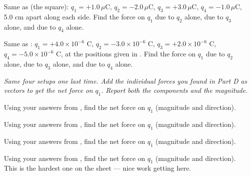 \documentclass[12pt]{article}
\begin{document}
\clearpage

\prob Same as  (the square): $q_1=+1.0\,\mu\text{C}$, $q_2=-2.0\,\mu\text{C}$, $q_3=+3.0\,\mu\text{C}$, $q_4=-1.0\,\mu\text{C}$, 5.0 cm apart along each side. Find the force on $q_1$ due to $q_2$ alone, due to $q_3$ alone, and due to $q_4$ alone.

\vspace{2cm}

\clearpage

\prob Same as : $q_1=+4.0\times10^{-6}$ C, $q_2=-3.0\times10^{-6}$ C, $q_3=+2.0\times10^{-6}$ C, $q_4=-5.0\times10^{-6}$ C, at the positions given in . Find the force on $q_1$ due to $q_2$ alone, due to $q_3$ alone, and due to $q_4$ alone.

\vspace{2cm}

\clearpage

\textit{Same four setups one last time. Add the individual forces you found in Part D as vectors to get the net force on $q_1$. Report both the components and the magnitude.}

\prob Using your answers from , find the net force on $q_1$ (magnitude and direction).


\prob Using your answers from , find the net force on $q_1$ (magnitude and direction).


\prob Using your answers from , find the net force on $q_1$ (magnitude and direction).


\clearpage

\prob Using your answers from , find the net force on $q_1$ (magnitude and direction). This is the hardest one on the sheet --- nice work getting here.

\end{document}
